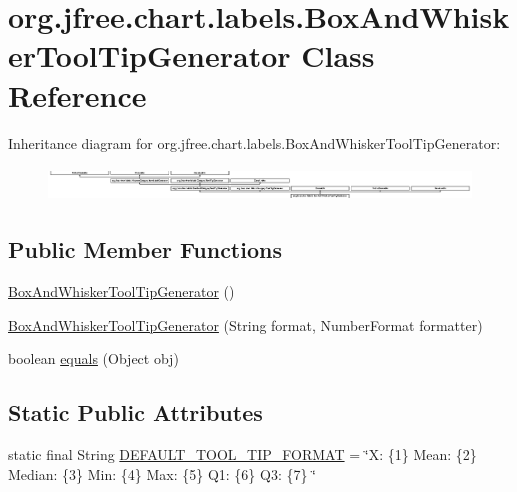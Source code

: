 \hypertarget{classorg_1_1jfree_1_1chart_1_1labels_1_1_box_and_whisker_tool_tip_generator}{}\section{org.\+jfree.\+chart.\+labels.\+Box\+And\+Whisker\+Tool\+Tip\+Generator Class Reference}
\label{classorg_1_1jfree_1_1chart_1_1labels_1_1_box_and_whisker_tool_tip_generator}
Inheritance diagram for org.\+jfree.\+chart.\+labels.\+Box\+And\+Whisker\+Tool\+Tip\+Generator\+:\begin{figure}[H]
\begin{center}
\leavevmode
\includegraphics[height=0.909091cm]{classorg_1_1jfree_1_1chart_1_1labels_1_1_box_and_whisker_tool_tip_generator}
\end{center}
\end{figure}
\subsection*{Public Member Functions}
\begin{DoxyCompactItemize}
\item 
\mbox{\hyperlink{classorg_1_1jfree_1_1chart_1_1labels_1_1_box_and_whisker_tool_tip_generator_af3bfa36dda7698c61c93fe9f41e6e7de}{Box\+And\+Whisker\+Tool\+Tip\+Generator}} ()
\item 
\mbox{\hyperlink{classorg_1_1jfree_1_1chart_1_1labels_1_1_box_and_whisker_tool_tip_generator_a02412e80309218c88a88aa2b0977dbe8}{Box\+And\+Whisker\+Tool\+Tip\+Generator}} (String format, Number\+Format formatter)
\item 
boolean \mbox{\hyperlink{classorg_1_1jfree_1_1chart_1_1labels_1_1_box_and_whisker_tool_tip_generator_acc735a840502385b15754202d35d3d71}{equals}} (Object obj)
\end{DoxyCompactItemize}
\subsection*{Static Public Attributes}
\begin{DoxyCompactItemize}
\item 
static final String \mbox{\hyperlink{classorg_1_1jfree_1_1chart_1_1labels_1_1_box_and_whisker_tool_tip_generator_a95e604a7ae781bff45237841a08da6ce}{D\+E\+F\+A\+U\+L\+T\+\_\+\+T\+O\+O\+L\+\_\+\+T\+I\+P\+\_\+\+F\+O\+R\+M\+AT}} = \char`\"{}X\+: \{1\} Mean\+: \{2\} Median\+: \{3\} Min\+: \{4\} Max\+: \{5\} Q1\+: \{6\} Q3\+: \{7\} \char`\"{}
\end{DoxyCompactItemize}
